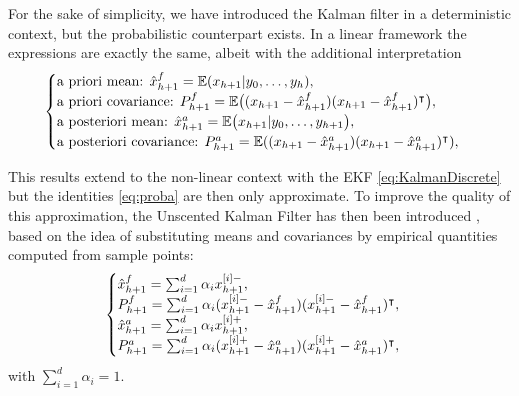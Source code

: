 For the sake of simplicity, we have introduced the Kalman filter in a deterministic context, but the probabilistic counterpart exists. In a linear framework the expressions are exactly the same, albeit with the additional interpretation
\begin{equation}\label{eq:proba}
	\begin{cases}
			\text{a priori mean: } \hat{x}_{h+1}^f = \mathbb{E}(x_{h+1}|y_0,\ldots,y_h),	\\
			\text{a priori covariance: }  P_{h+1}^f = \mathbb{E}\bigl((x_{h+1}-\hat{x}_{h+1}^f)(x_{h+1}-\hat{x}_{h+1}^f)^\intercal\bigr), \\
			\text{a posteriori mean: } \hat{x}_{h+1}^a = \mathbb{E}\bigl(x_{h+1}|y_0,\ldots,y_{h+1}\bigr), \\
			\text{a posteriori covariance: } P_{h+1}^a = \mathbb{E}((x_{h+1}-\hat{x}_{h+1}^a)(x_{h+1}-\hat{x}_{h+1}^a)^\intercal),
	\end{cases}
\end{equation}

This results extend to the non-linear context with the EKF \eqref{eq:KalmanDiscrete} but the identities \eqref{eq:proba} are then only approximate. To improve the quality of this approximation, the Unscented Kalman Filter has then been introduced \cite{Julier00}, based on the idea of substituting means and covariances by empirical quantities computed from sample points:
\begin{equation}\label{eq:probaEmpirical}
	\begin{cases}
			\hat{x}_{h+1}^f = \sum_{i=1}^d \alpha_ix_{h+1}^{[i]-},	\\
			P_{h+1}^f = \sum_{i=1}^d \alpha_i(x_{h+1}^{[i]-}-\hat{x}_{h+1}^f)(x_{h+1}^{[i]-}-\hat{x}_{h+1}^f)^\intercal, \\
			\hat{x}_{h+1}^a = \sum_{i=1}^d \alpha_ix_{h+1}^{[i]+}, \\
			P_{h+1}^a = \sum_{i=1}^d \alpha_i(x_{h+1}^{[i]+}-\hat{x}_{h+1}^a)(x_{h+1}^{[i]+}-\hat{x}_{h+1}^a)^\intercal,
	\end{cases}
\end{equation}
with $\sum_{i=1}^d \alpha_i = 1$.

